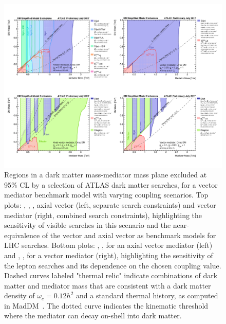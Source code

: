 \begin{figure}[!htpb]
\includegraphics[width=\textwidth]{figures/SummaryPlotsMassMass.pdf}\caption{
Regions in a dark matter mass-mediator mass plane excluded at 95\% CL by a selection of ATLAS dark matter searches, for a vector mediator benchmark model with varying coupling scenarios. Top plots: , , , axial vector (left, separate search constraints) and vector mediator (right, combined search constraints), highlighting the sensitivity of visible searches in this scenario and the near-equivalence of the vector and axial vector as benchmark models for LHC searches. Bottom plots: , ,  for an axial vector mediator (left) and , ,  for a vector mediator (right), highlighting the sensitivity of the lepton searches and its dependence on the chosen coupling value. Dashed curves labeled "thermal relic" indicate combinations of dark matter and mediator mass that are consistent with a dark matter density of $\omega_c = 0.12 h^2$ and a standard thermal history, as computed in MadDM~\cite{Backovic:2015cra}. The dotted curve indicates the kinematic threshold where the mediator can decay on-shell into dark matter. }
\label{fig:sensitivityComparison}
\end{figure}

